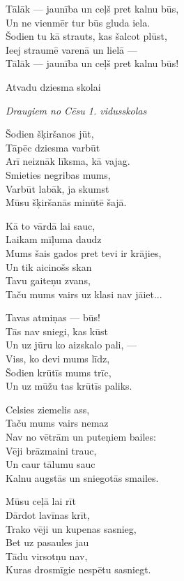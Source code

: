\documentclass[14pt]{extarticle}
\begin{document}
{Tālāk --- jaunība un ceļš pret kalnu būs,\\
Un ne vienmēr tur būs gluda iela.\\
Šodien tu kā strauts, kas šalcot plūst,\\
Ieej straumē varenā un lielā ---\\
Tālāk --- jaunība un ceļš pret kalnu būs!

\newpage

{\large \sc Atvadu dziesma skolai}

{\em Draugiem no Cēsu 1. vidusskolas}

Šodien šķiršanos jūt,\\
Tāpēc dziesma varbūt\\
Arī neiznāk līksma, kā vajag.\\
Smieties negribas mums,\\
Varbūt labāk, ja skumst\\
Mūsu šķiršanās minūtē šajā.

Kā to vārdā lai sauc,\\
Laikam mīļuma daudz\\
Mums šais gados pret tevi ir krājies,\\
Un tik aicinošs skan\\
Tavu gaiteņu zvans,\\
Taču mums vairs uz klasi nav jāiet...

Tavas atmiņas --- būs!\\
Tās nav sniegi, kas kūst\\
Un uz jūru ko aizskalo pali, ---\\
Viss, ko devi mums līdz,\\
Šodien krūtīs mums trīc,\\
Un uz mūžu tas krūtīs paliks.

Celsies ziemelis ass,\\
Taču mums vairs nemaz\\
Nav no vētrām un puteņiem bailes:\\
Vēji brāzmaini trauc,\\
Un caur tālumu sauc\\
Kalnu augstās un sniegotās smailes.

Mūsu ceļā lai rīt\\
Dārdot lavīnas krīt,\\
Trako vēji un kupenas sasnieg,\\
Bet uz pasaules jau\\
Tādu virsotņu nav,\\
Kuras drosmīgie nespētu sasniegt.

}
\end{document}
